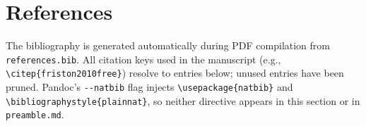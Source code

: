 \documentclass[
  english,
]{article}
\begin{document}
\newpage

\section{References}\label{references}

The bibliography is generated automatically during PDF compilation from
\texttt{references.bib}. All citation keys used in the manuscript (e.g.,
\texttt{\textbackslash{}citep\{friston2010free\}}) resolve to entries
below; unused entries have been pruned. Pandoc's \texttt{-\/-natbib}
flag injects \texttt{\textbackslash{}usepackage\{natbib\}} and
\texttt{\textbackslash{}bibliographystyle\{plainnat\}}, so neither
directive appears in this section or in \texttt{preamble.md}.

\clearpage


\end{document}
